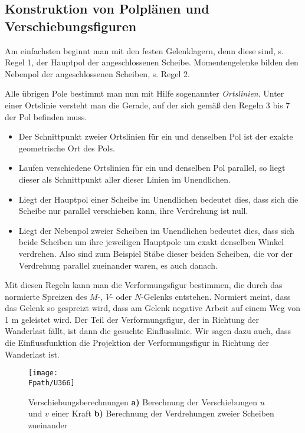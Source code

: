 {\textcolor{sectionTitleBlue}{\subsection{Konstruktion von Polpl\"{a}nen und Verschiebungsfiguren}}}


Am einfachsten beginnt man mit den festen Gelenklagern, denn diese sind, s. Regel 1, der Hauptpol der angeschlossenen Scheibe. Momentengelenke bilden den Nebenpol der angeschlossenen Scheiben, s. Regel 2.

Alle \"{u}brigen Pole bestimmt man nun mit Hilfe sogenannter {\em Ortslinien\/}. Unter einer Ortslinie versteht man die Gerade, auf der sich gem\"{a}{\ss} den Regeln 3 bis 7 der Pol befinden muss.\\

\begin{itemize}
  \item Der Schnittpunkt zweier Ortslinien f\"{u}r ein und denselben Pol ist der exakte geometrische Ort des Pols.
  \item Laufen verschiedene Ortslinien f\"{u}r ein und denselben Pol parallel, so liegt dieser als Schnittpunkt aller dieser Linien im Unendlichen.
  \item Liegt der Hauptpol einer Scheibe im Unendlichen bedeutet dies, dass sich die Scheibe nur parallel verschieben kann, ihre Verdrehung ist null.
  \item  Liegt der Nebenpol zweier Scheiben im Unendlichen bedeutet dies, dass sich beide Scheiben um ihre jeweiligen Hauptpole um exakt denselben Winkel verdrehen. Also sind zum Beispiel St\"{a}be dieser beiden Scheiben, die vor der Verdrehung parallel zueinander waren, es auch danach.
\end{itemize}

Mit diesen Regeln kann man die Verformungsfigur bestimmen, die durch das \glq normierte\grq{} Spreizen des $M$-, $V$- oder $N$-Gelenks entstehen. Normiert meint, dass das Gelenk so gespreizt wird, dass am Gelenk negative Arbeit auf einem Weg von 1 m geleistet wird. Der Teil der Verformungsfigur, der in Richtung der Wanderlast f\"{a}llt, ist dann die gesuchte Einflusslinie. Wir sagen dazu auch, dass die Einflussfunktion die \glq Projektion\grq{} der Verformungsfigur in Richtung der Wanderlast ist.

\begin{figure}[tbp]
\centering
\if {} \sidecaption \fi
\texttt{[image: \\Fpath/U366]}
\caption{Verschiebungsberechnungen \textbf{ a)} Berechnung der Verschiebungen $u$ und $v$ einer Kraft \textbf{ b)} Berechnung der Verdrehungen zweier Scheiben zueinander } \label{U366}
\end{figure}%

